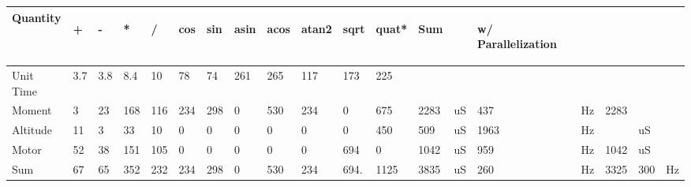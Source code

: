 \documentclass{article}
\numberwithin{equation}{section} %
\begin{document}
\begin{longtable}{l l l l l l l l l l l l l l l l l l l }
Quantity&	
\begin{sideways}+\end{sideways}	&	
\begin{sideways}-\end{sideways}	&	
\begin{sideways}*\end{sideways}	&	
\begin{sideways}/\end{sideways}	&	
\begin{sideways}cos\end{sideways}	&	
\begin{sideways}sin\end{sideways}	&	
\begin{sideways}asin\end{sideways}	&	
\begin{sideways}acos\end{sideways}	&	
\begin{sideways}atan2\end{sideways}	&	
\begin{sideways}sqrt\end{sideways}	&	
\begin{sideways}quat*\end{sideways}	&	
\begin{sideways}Sum\end{sideways} & &
\begin{sideways}w/ Parallelization \end{sideways} & & &\\
	\hline
Unit Time&	3.7	&	3.8	&	8.4	&	10	&	78	&	74	&	261	&	265	&	117	&	173	&	225	&		&		&		&		&		&		&		 \\
	\hline
Moment	&	3	&	23	&	168	&	116&	234	&	298	&	0	&	530	&	234	&	0	&	675	&	2283	&	uS	&	437	&	Hz	&	2283	&		&					 \\
	\hline
Altitude	&	11	&	3	&	33	&	10	&	0	&	0	&	0	&	0	&	0	&	0	&	450	&	509	&	uS	&	1963	&	Hz	&		&	uS	&					 \\
	\hline
Motor	&	52	&	38	&	151	&	105	&	0	&	0	&	0	&	0	&	0	&	694	&	0	&	1042	&	uS	&	959	&	Hz	&	1042	&	uS	&					 \\
	\hline
Sum	&	67	&	65	&	352	&	232	&	234	&	298	&	0	&	530	&	234	&	694.	&	1125	&	3835	&	uS	&	260	&	Hz	&	3325	&	300	&	Hz		
\end{longtable}

\clearpage %
\end{document}
